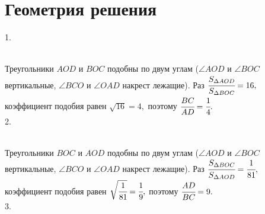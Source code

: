 \documentclass[12pt]{article}
\begin{document}
\section{Геометрия решения}
1. \begin{figure}[ht!]
\end{figure}\\
Треугольники $AOD$ и $BOC$ подобны по двум углам ($\angle AOD$ и $\angle BOC$ вертикальные, $\angle BCO$ и $\angle OAD$ накрест лежащие). Раз
$\cfrac{S_{\Delta AOD}}{S_{\Delta BOC}}=16,$ коэффициент подобия равен $\sqrt{16}=4,$ поэтому $\cfrac{BC}{AD}=\cfrac{1}{4}.$\\
2. \begin{figure}[ht!]
\end{figure}\\
Треугольники $BOC$ и $AOD$ подобны по двум углам ($\angle AOD$ и $\angle BOC$ вертикальные, $\angle BCO$ и $\angle OAD$ накрест лежащие). Раз
$\cfrac{S_{\Delta BOC}}{S_{\Delta AOD}}=\cfrac{1}{81},$ коэффициент подобия равен $\sqrt{\cfrac{1}{81}}=\cfrac{1}{9},$ поэтому $\cfrac{AD}{BC}=9.$\\
3. \begin{figure}[ht!]
\end{figure}\\
\end{document}
